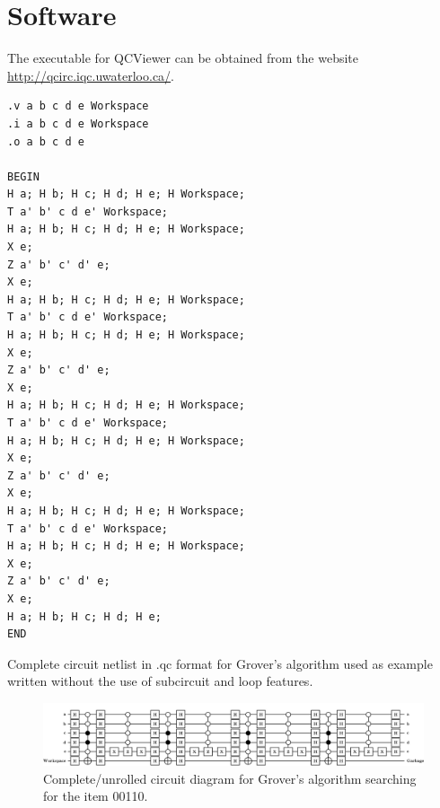 \documentclass[aps,prl,reprint,floatfix,superscriptaddress]{revtex4-1} %
\begin{document}
\section{Software}
The executable for QCViewer can be obtained from the website \url{http://qcirc.iqc.uwaterloo.ca/}.

\begin{program}[p]
\begin{verbatim}
.v a b c d e Workspace
.i a b c d e Workspace
.o a b c d e

BEGIN
H a; H b; H c; H d; H e; H Workspace;
T a' b' c d e' Workspace;
H a; H b; H c; H d; H e; H Workspace;
X e;
Z a' b' c' d' e;
X e;
H a; H b; H c; H d; H e; H Workspace;
T a' b' c d e' Workspace;
H a; H b; H c; H d; H e; H Workspace;
X e;
Z a' b' c' d' e;
X e;
H a; H b; H c; H d; H e; H Workspace;
T a' b' c d e' Workspace;
H a; H b; H c; H d; H e; H Workspace;
X e;
Z a' b' c' d' e;
X e;
H a; H b; H c; H d; H e; H Workspace;
T a' b' c d e' Workspace;
H a; H b; H c; H d; H e; H Workspace;
X e;
Z a' b' c' d' e;
X e;
H a; H b; H c; H d; H e;
END
\end{verbatim}
\caption{Complete circuit netlist in .qc format for Grover's algorithm used as example written without the use of subcircuit and loop features.}
\label{l:netlist}
\end{program}
\begin{figure}[p]
\includegraphics[scale=0.3]{grover_netlist}
\caption{Complete/unrolled circuit diagram for Grover's algorithm searching for the item 00110.}
\label{f:netlist}
\end{figure}


\end{document}
